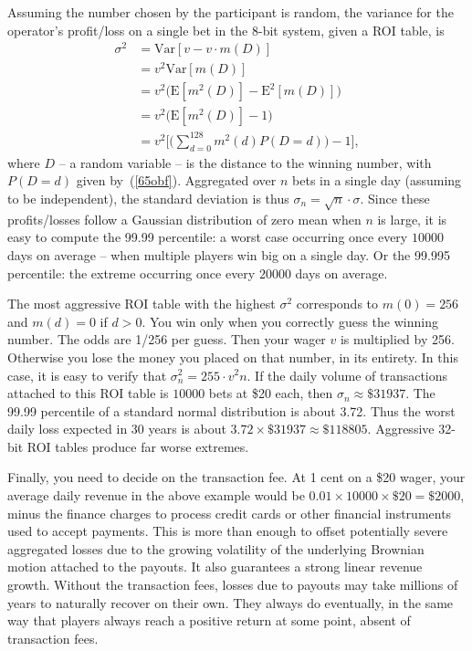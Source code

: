 \documentclass[oneside,10pt]{book}
\begin{document}
Assuming the number chosen by the participant is random, the variance for the operator's profit/loss on a 
 single bet in the 8-bit system, given a ROI table, is
\begin{align}
\sigma^2 & =  \text{Var}[v  - v \cdot m(D)] \nonumber \\
 & = v^2 \text{Var}[m(D)]\\
  & = v^2 \Big(\text{E}[m^2(D)] - \text{E}^2[m(D)]\Big) \nonumber \\ 
  & = v^2 \Big(\text{E}[m^2(D)] - 1\Big)  \nonumber \\
  & = v^2 \Bigg[\Big(\sum_{d=0}^{128} m^2(d) P(D=d)\Big) -1\Bigg], \label{p120jh}
\end{align}
where  $D$  -- a random variable -- is the distance to the winning number, 
 with $P(D=d)$ given by~(\ref{65obf}). Aggregated over $n$ bets in a single day (assuming to be independent),
 the standard deviation is thus $\sigma_n = \sqrt{n}\cdot\sigma$. Since these profits/losses follow a Gaussian distribution of zero mean when $n$ is large, 
 it is easy to compute the 99.99 percentile: a worst case occurring once every $\num{10000}$ days on average -- when multiple players win big on a single day. Or the 99.995 percentile: the extreme occurring once every $\num{20000}$ days on average.

The most aggressive ROI table with the highest $\sigma^2$ corresponds to $m(0)=256$ and $m(d)=0$ if $d>0$. 
 You win only when you correctly guess the winning number. The odds are 1/256 per guess. Then your wager $v$ is multiplied
 by 256. Otherwise you lose the money you placed on that number, in its entirety.  In this case, it is easy to verify that 
$\sigma^2_n= 255 \cdot v^2 n$. 
If the daily volume of transactions attached to this ROI table 
 is $\num{10000}$ bets at \$20 each, then $\sigma_n \approx \$\num{31937}$. The 99.99 percentile of a standard normal distribution is about 3.72. Thus the worst daily loss expected in 30 years is about $3.72 \times \$\num{31937} \approx \$\num{118805}$. Aggressive 32-bit ROI tables produce far worse extremes.

Finally, you need to decide on the transaction fee. At 1 cent on a \$20 wager, your average daily revenue
 in the above example would be $0.01 \times \num{10000}\times \$20 = \$2000$, minus the finance charges to process credit cards or other financial instruments used to accept payments. This is more than enough to offset potentially severe aggregated losses due to the growing volatility of the underlying Brownian motion attached to the payouts. It also 
 guarantees a strong linear revenue growth. Without the transaction fees, losses due to payouts may take millions of years to naturally recover on their own. They always do eventually, in the same way that players always reach a positive return at some point, absent of transaction fees. 
\end{document}
